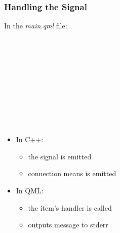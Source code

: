\begin{slide}[fragile]\frametitle{Handling the Signal}

In the \textit{main.qml} file:

\begin{qml}
\vspace*{0.5em}
\\
\\
\vspace*{0.5em}
\\
\\
\vspace*{0.5em}
\\
\\
\qtt{~~~~~~~~\}}\\
\qtt{~~~~\}}\\
\qtt{\}}\\
\end{qml}

\begin{itemize}
\item In C++:
  \begin{itemize}
  \item the  signal is emitted
  \item connection means  is emitted
  \end{itemize}
\item In QML:
  \begin{itemize}
  \item the  item's  handler is called
  \item outputs message to stderr
  \end{itemize}
\end{itemize}

\end{slide}



